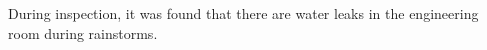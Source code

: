 During inspection, it was found that there are water leaks in the engineering room during rainstorms.


%
%
%
%
%
%
%


